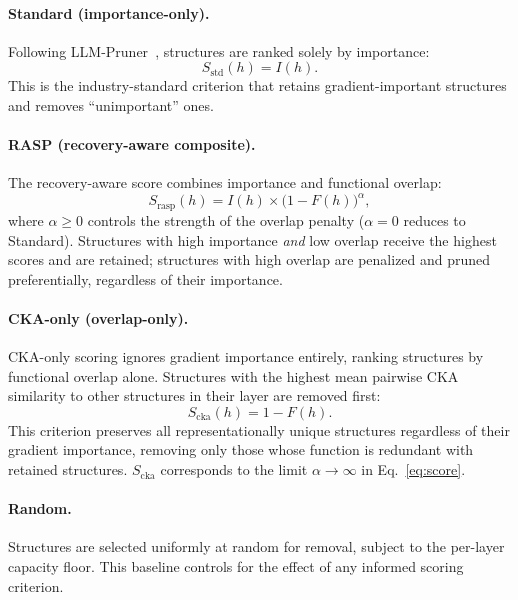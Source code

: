 \paragraph{Standard (importance-only).}
Following LLM-Pruner~\citep{llmpruner2023}, structures are ranked solely by importance:
\begin{equation}
    S_\text{std}(h) = I(h).
    \label{eq:standard}
\end{equation}
This is the industry-standard criterion that retains gradient-important structures and removes ``unimportant'' ones.

\paragraph{RASP (recovery-aware composite).}
The recovery-aware score combines importance and functional overlap:
\begin{equation}
    S_\text{rasp}(h) = I(h) \times \big(1 - F(h)\big)^\alpha,
    \label{eq:score}
\end{equation}
where $\alpha \ge 0$ controls the strength of the overlap penalty ($\alpha{=}0$ reduces to Standard).
Structures with high importance \emph{and} low overlap receive the highest scores and are retained; structures with high overlap are penalized and pruned preferentially, regardless of their importance.

\paragraph{CKA-only (overlap-only).}
CKA-only scoring ignores gradient importance entirely, ranking structures by functional overlap alone.
Structures with the highest mean pairwise CKA similarity to other structures in their layer are removed first:
\begin{equation}
    S_\text{cka}(h) = 1 - F(h).
    \label{eq:cka_only}
\end{equation}
This criterion preserves all representationally unique structures regardless of their gradient importance, removing only those whose function is redundant with retained structures.
$S_\text{cka}$ corresponds to the limit $\alpha \to \infty$ in Eq.~\ref{eq:score}.

\paragraph{Random.}
Structures are selected uniformly at random for removal, subject to the per-layer capacity floor.
This baseline controls for the effect of any informed scoring criterion.

